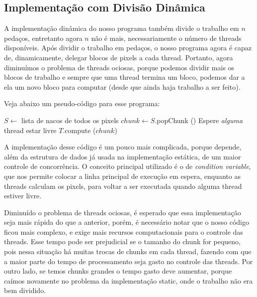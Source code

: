 \documentclass[12pt]{article}
\begin{document}
\subsection{Implementação com Divisão Dinâmica}
A implementação dinâmica do nosso programa também divide o trabalho em
$n$ pedaços, entretanto agora $n$ não é mais, necessariamente o número
de threads disponíveis. Após dividir o trabalho em pedaços, o nosso 
programa agora é capaz de, dinamicamente, delegar blocos de pixels a 
cada thread. Portanto, agora diminuímos o problema de threads ociosas,
porque podemos dividir mais os blocos de trabalho e sempre que uma 
thread termina um bloco, podemos dar a ela um novo bloco para computar 
(desde que ainda haja trabalho a ser feito).

Veja abaixo um pseudo-código para esse programa:
\begin{algorithmic}[1]
    \State $S \gets $ lista de nacos de todos os pixels
        \State $chunk \gets S$.popChunk ()
        \State Espere {\em alguma} thread estar livre
                \State $T$.compute ($chunk$)
            \EndIf
        \EndFor
    \EndWhile 
    \EndFunction
\end{algorithmic}

A implementação desse código é um pouco mais complicada, porque depende,
além da estrutura de dados já usada na implementação estática, de um 
maior controle de concorrência. O conceito principal utilizado é o de 
{\em condition variable}, que nos permite colocar a linha principal de
execução em espera, enquanto as threads calculam os pixels, para voltar
a ser executada quando alguma thread estiver livre.

Diminuído o problema de threads ociosas, é esperado que essa 
implementação seja mais rápida do que a anterior, porém, é necessário 
notar que o nosso código ficou mais complexo, e exige mais recursos
computacionais para o controle das threads. Esse tempo pode ser 
prejudicial se o tamanho do chunk for pequeno, pois nessa situação
há muitas trocas de chunks em cada thread, fazendo com que a maior parte
do tempo de processamento seja gasto no controle das threads. Por outro
lado, se temos chunks grandes o tempo gasto deve aumentar, porque caímos
novamente no problema da implementação static, onde o trabalho não era
bem dividido.
\end{document}
